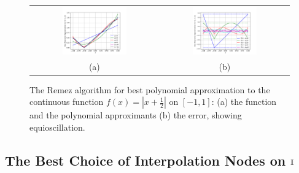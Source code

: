 \begin{figure}[htbp]
\begin{center}
\begin{tabular}{cc}
\hspace*{-0.5cm}\includegraphics[width=0.525\textwidth]{BPAabs}&
\hspace*{-0.5cm}\includegraphics[width=0.525\textwidth]{BPAerrabs}\\
(a) & (b)\\
\end{tabular}
\caption{The Remez algorithm for best polynomial approximation to the continuous function $f(x) = |x+\tfrac{1}{2}|$ on $[-1,1]$: (a) the function and the polynomial approximants (b) the error, showing equioscillation.}
\label{figure:Remez}
\end{center}
\end{figure}


\subsection{The Best Choice of Interpolation Nodes on $\mathbb{I}$}\label{subsection:ChebyshevPointsAreTheBest}

